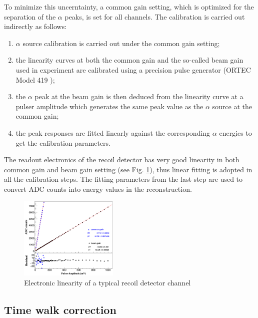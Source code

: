 \documentclass[number,5p]{elsarticle}
\begin{document}
To minimize this uncerntainty, a common gain setting, which is optimized for the separation of the \(\alpha\) peaks, is set for all channels.
The calibration is carried out indirectly as follows:
\begin{enumerate}
\item \(\alpha\) source calibration is carried out under the common gain setting;
\item the linearity curves at both the common gain and the so-called beam gain used
  in experiment are calibrated using a precision pulse generator (ORTEC Model
  419 \cite{ortec});
\item the $\alpha$ peak at the beam gain is then deduced
  from the linearity curve at a pulser amplitude which generates the same peak
  value as the $\alpha$ source at the common gain;
\item the peak responses are fitted linearly against the corresponding $\alpha$ energies
  to get the calibration parameters.
\end{enumerate}
The readout electronics of the recoil detector has very good linearity in both
common gain and beam gain setting (see Fig. \ref{fig:electronic_linearity}),
thus linear fitting is adopted in all the calibration steps.
The fitting parameters from the last step are used to convert ADC counts into
energy values in the reconstruction.
\begin{figure}[htb!]
  \centering
  \includegraphics[width=0.42\textwidth]{./linearity.png}
  \caption{Electronic linearity of a typical recoil detector channel}
  \label{fig:electronic_linearity}
\end{figure}

\subsection{Time walk correction}
\label{sec:timewalk}
\end{document}
